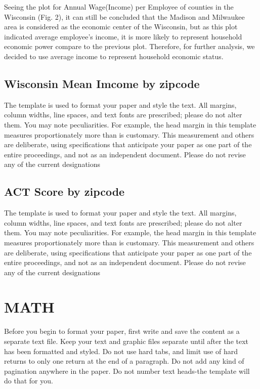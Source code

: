 \documentclass[letterpaper, 10 pt, conference]{ieeeconf}  %
\begin{document}
Seeing the plot for Annual Wage(Income) per Employee of counties in the Wisconsin (Fig. 2), it can still be concluded that the Madison and Milwaukee area is considered as the economic center of the Wisconsin, but as this plot indicated average employee's income, it is more likely to represent household economic power compare to the previous plot.
Therefore, for further analysis, we decided to use average income to represent household economic status.

\subsection{Wisconsin Mean Imcome by zipcode}

The template is used to format your paper and style the text. All margins, column widths, line spaces, and text fonts are prescribed; please do not alter them. You may note peculiarities. For example, the head margin in this template measures proportionately more than is customary. This measurement and others are deliberate, using specifications that anticipate your paper as one part of the entire proceedings, and not as an independent document. Please do not revise any of the current designations

\subsection{ACT Score by zipcode}

The template is used to format your paper and style the text. All margins, column widths, line spaces, and text fonts are prescribed; please do not alter them. You may note peculiarities. For example, the head margin in this template measures proportionately more than is customary. This measurement and others are deliberate, using specifications that anticipate your paper as one part of the entire proceedings, and not as an independent document. Please do not revise any of the current designations

\section{MATH}

Before you begin to format your paper, first write and save the content as a separate text file. Keep your text and graphic files separate until after the text has been formatted and styled. Do not use hard tabs, and limit use of hard returns to only one return at the end of a paragraph. Do not add any kind of pagination anywhere in the paper. Do not number text heads-the template will do that for you.
\end{document}
